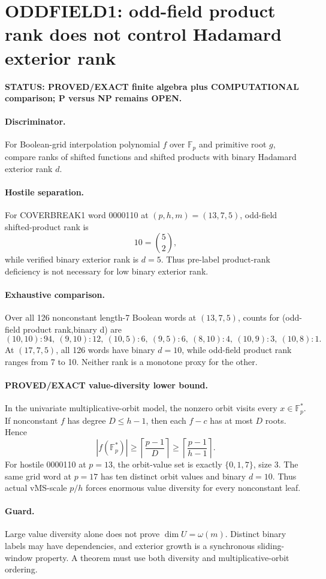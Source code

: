 \documentclass[11pt]{article}\usepackage[margin=.88in]{geometry}\usepackage{amsmath,amssymb}
\begin{document}
\section*{ODDFIELD1: odd-field product rank does not control Hadamard exterior rank}
\textbf{STATUS: PROVED/EXACT finite algebra plus COMPUTATIONAL comparison; P versus NP remains OPEN.}
\paragraph{Discriminator.} For Boolean-grid interpolation polynomial \(f\) over \(\mathbb F_p\) and primitive root \(g\), compare ranks of shifted functions and shifted products with binary Hadamard exterior rank \(d\).
\paragraph{Hostile separation.} For COVERBREAK1 word 0000110 at \((p,h,m)=(13,7,5)\), odd-field shifted-product rank is
\[
\boxed{10=\binom52},
\]
while verified binary exterior rank is \(\boxed{d=5}\). Thus pre-label product-rank deficiency is not necessary for low binary exterior rank.
\paragraph{Exhaustive comparison.} Over all 126 nonconstant length-7 Boolean words at \((13,7,5)\), counts for (odd-field product rank,binary d) are
\[
(10,10):94,\ (9,10):12,\ (10,5):6,\ (9,5):6,\ (8,10):4,\ (10,9):3,\ (10,8):1.
\]
At \((17,7,5)\), all 126 words have binary \(d=10\), while odd-field product rank ranges from 7 to 10. Neither rank is a monotone proxy for the other.
\paragraph{PROVED/EXACT value-diversity lower bound.} In the univariate multiplicative-orbit model, the nonzero orbit visits every \(x\in\mathbb F_p^*\). If nonconstant \(f\) has degree \(D\le h-1\), then each \(f-c\) has at most \(D\) roots. Hence
\[
\boxed{|f(\mathbb F_p^*)|\ge\left\lceil\frac{p-1}{D}\right\rceil\ge\left\lceil\frac{p-1}{h-1}\right\rceil.}
\]
For hostile 0000110 at \(p=13\), the orbit-value set is exactly \(\{0,1,7\}\), size 3. The same grid word at \(p=17\) has ten distinct orbit values and binary \(d=10\). Thus actual vMS-scale \(p/h\) forces enormous value diversity for every nonconstant leaf.
\paragraph{Guard.} Large value diversity alone does not prove \(\dim U=\omega(m)\). Distinct binary labels may have dependencies, and exterior growth is a synchronous sliding-window property. A theorem must use both diversity and multiplicative-orbit ordering.
\end{document}
